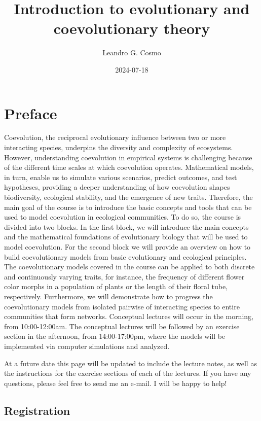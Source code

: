 \documentclass[
]{book}
\title{Introduction to evolutionary and coevolutionary theory}
\author{Leandro G. Cosmo}
\date{2024-07-18}
\begin{document}
\maketitle

{
\setcounter{tocdepth}{1}
\tableofcontents
}
\hypertarget{preface}{%
\chapter{Preface}\label{preface}}

Coevolution, the reciprocal evolutionary influence between two or more interacting species, underpins the diversity and complexity of ecosystems. However, understanding coevolution in empirical systems is challenging because of the different time scales at which coevolution operates. Mathematical models, in turn, enable us to simulate various scenarios, predict outcomes, and test hypotheses, providing a deeper understanding of how coevolution shapes biodiversity, ecological stability, and the emergence of new traits. Therefore, the main goal of the course is to introduce the basic concepts and tools that can be used to model coevolution in ecological communities. To do so, the course is divided into two blocks. In the first block, we will introduce the main concepts and the mathematical foundations of evolutionary biology that will be used to model coevolution. For the second block we will provide an overview on how to build coevolutionary models from basic evolutionary and ecological principles. The coevolutionary models covered in the course can be applied to both discrete and continuously varying traits, for instance, the frequency of different flower color morphs in a population of plants or the length of their floral tube, respectively. Furthermore, we will demonstrate how to progress the coevolutionary models from isolated pairwise of interacting species to entire communities that form networks. Conceptual lectures will occur in the morning, from 10:00-12:00am. The conceptual lectures will be followed by an exercise section in the afternoon, from 14:00-17:00pm, where the models will be implemented via computer simulations and analyzed.

At a future date this page will be updated to include the lecture notes, as well as the instructions for the exercise sections of each of the lectures. If you have any questions, please feel free to send me an e-mail. I will be happy to help!

\hypertarget{registration}{%
\section{Registration}\label{registration}}
\end{document}
